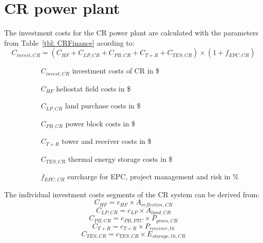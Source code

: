\documentclass[Master,MEE,english]{twbook}%
\begin{document}
\section{CR power plant}
The investment costs for the CR power plant are calculated with the parameters from Table~\ref{tbl: CRFinance} acording to:
\begin{equation}
C_{invest,CR} = (C_{HF}+C_{LP,CR}+C_{PB,CR}+C_{T+R}+C_{TES,CR})\times(1+f_{EPC,CR}) \label{GL_CRInvest}
\end{equation} 
\begin{itemize}
\item[ ] 
\begin{itemize}
\item[ ] 
\begin{itemize}
\item[$C_{invest,CR}$]investment costs of CR in \$
\item[$C_{HF}$]heliostat field costs in \$
\item[$C_{LP,CR}$]land purchase costs in \$
\item[$C_{PB,CR}$]power block costs in \$
\item[$C_{T+R}$]tower and receiver costs in \$
\item[$C_{TES,CR}$]thermal energy storage costs in \$
\item[$f_{EPC,CR}$]surcharge for EPC, project management and risk in \%
\end{itemize}
\end{itemize}
\end{itemize}
The individual investment costs segments of the CR system can be derived from:
\begin{equation}
C_{HF} = c_{HF} \times A_{reflective,CR}
\end{equation} 
\begin{equation}
C_{LP,CR} = c_{LP} \times A_{land,CR}
\end{equation} 
\begin{equation}
C_{PB,CR} = c_{PB,PTC} \times P_{gross,CR}
\end{equation} 
\begin{equation}
C_{T+R} = c_{T+R} \times P_{receiver,th}
\end{equation} 
\begin{equation}
C_{TES,CR} = c_{TES,CR} \times E_{storage,th,CR}
\end{equation} 
\end{document}
